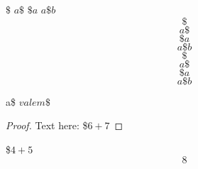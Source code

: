 \documentclass[11pt]{article}
\begin{document}
$\$$
$a\$$
$\$a$
$a\$b$
$$\$$$
$$a\$$$
$$\$a$$
$$a\$b$$
\begin{equation}\$\end{equation}
\begin{equation}a\$\end{equation}
\begin{equation}\$a\end{equation}
\begin{equation}a\$b\end{equation}

a\$ $valem$$\$$

\begin{proof}
Text here: \$$6+7$
\end{proof}

\$$4+5$$$8$$
\end{document}
